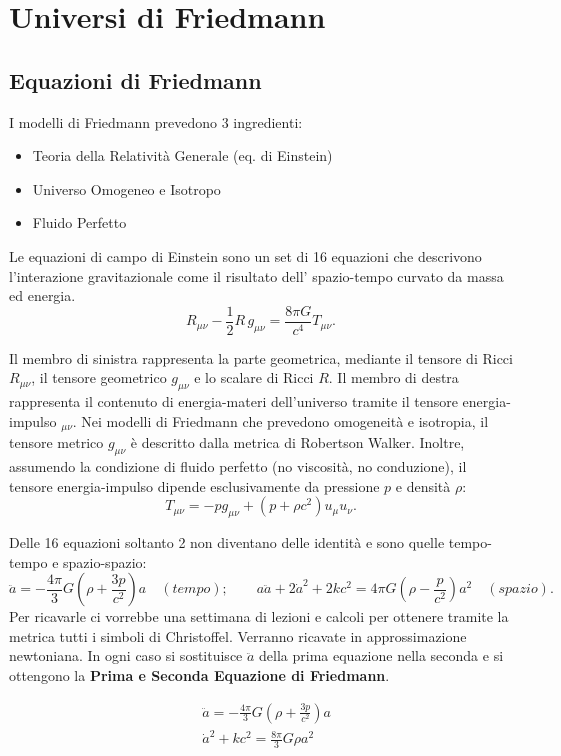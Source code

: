\chapter{Universi di Friedmann}\label{2:chuniinfuga}

\section{Equazioni di Friedmann}
I modelli di Friedmann prevedono 3 ingredienti:
\begin{itemize}
    \item Teoria della Relatività Generale (eq. di Einstein)
    \item Universo Omogeneo e Isotropo
    \item Fluido Perfetto
\end{itemize}


Le equazioni di campo di Einstein sono un set di 16 equazioni che descrivono l'interazione gravitazionale come il risultato dell' spazio-tempo curvato da massa ed energia. 
$$R_{\mu \nu} - \frac{1}{2} R \, g_{\mu \nu} = \frac{8 \pi G}{c^4} T_{\mu \nu}.$$

Il membro di sinistra rappresenta la parte geometrica, mediante il tensore di Ricci $R_{\mu \nu}$, il tensore geometrico $g_{\mu \nu}$ e lo scalare di Ricci $R$. Il membro di destra rappresenta il contenuto di energia-materi dell'universo tramite il tensore energia-impulso $_{\mu \nu}$. 
Nei modelli di Friedmann che prevedono omogeneità e isotropia, il tensore metrico $g_{\mu \nu}$ è descritto dalla metrica di Robertson Walker. Inoltre, assumendo la condizione di fluido perfetto (no viscosità, no conduzione), il tensore energia-impulso dipende esclusivamente da pressione $p$ e densità $\rho$:
$$T_{\mu \nu}=-pg_{\mu \nu}+(p+\rho c^2)u_\mu u_\nu .$$

Delle 16 equazioni soltanto 2 non diventano delle identità e sono quelle tempo-tempo e spazio-spazio:
$$
\ddot{a}=-\frac{4\pi}{3}G\left ( \rho+\frac{3p}{c^2} \right )a\quad (tempo); \qquad
a\ddot{a}+2\dot{a}^2+2kc^2=4\pi G \left ( \rho - \frac{p}{c^2} \right )a^2\quad (spazio).
$$
Per ricavarle ci vorrebbe una settimana di lezioni e calcoli per ottenere tramite la metrica tutti i simboli di Christoffel. Verranno ricavate in approssimazione newtoniana. In ogni caso si sostituisce $\ddot{a}$ della prima equazione nella seconda e si ottengono la \textbf{Prima e Seconda Equazione di Friedmann}.

\begin{align}
   & \ddot{a}  =-\frac{4\pi}{3}G\left ( \rho+\frac{3p}{c^2} \right )a \label{eq:friedmann1}\\
   & \dot{a}^2+kc^2  =\frac{8\pi}{3}G\rho a^2 \label{eq:friedmann2}
\end{align}

